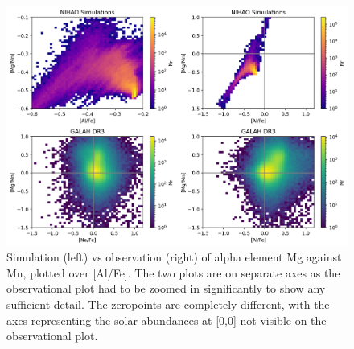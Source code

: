 \documentclass[fleqn,usenatbib]{mnras}
\newcommand{\SB}[1]{{\textcolor{orange}{SB: #1}}}
\begin{document}

\begin{figure}
	\includegraphics[width=\textwidth]{figures/[MgMn] vs [AlFe].png}
    \caption{Simulation (left) vs observation (right) of alpha element Mg against Mn, plotted over [Al/Fe]. The two plots are on separate axes as the observational plot had to be zoomed in significantly to show any sufficient detail. The zeropoints are completely different, with the axes representing the solar abundances at [0,0] not visible on the observational plot. 
    }
    \label{fig:alfe_mgmn}
\end{figure}
\end{document}
